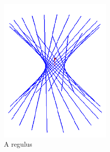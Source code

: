 \documentclass[a4paper, 10pt]{article}
\begin{document}
\begin{figure}[htbp]
  \centering
  \includegraphics[width=0.5\textwidth]{regulus.png}
  \caption{A regulus}
  \label{fig:regulus}
\end{figure}



\end{document}
